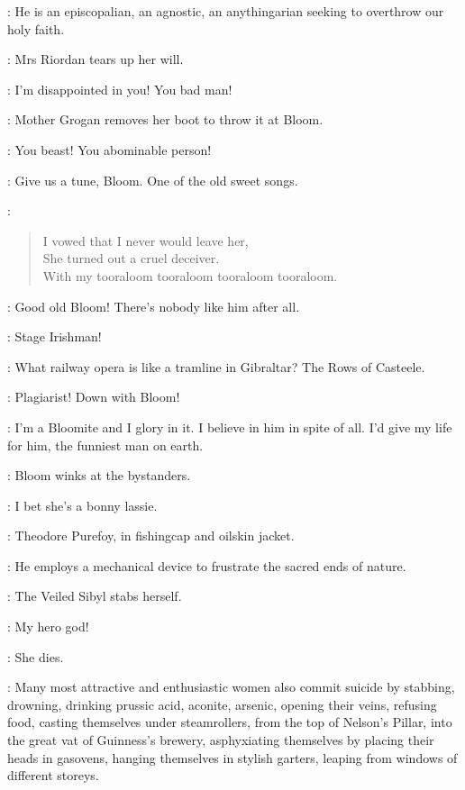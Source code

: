 \FatherFarley[1]:
He is an episcopalian,
an agnostic,
an anythingarian
seeking to overthrow our holy faith.

:
Mrs Riordan tears up her will.

\MrsRiordan:
I'm disappointed in you!
You bad man!

:
Mother Grogan removes her boot to throw it at Bloom.

\MotherGrogan:
You beast!
You abominable person!

\NoseyFlynn[2]:
Give us a tune,
Bloom.
One of the old sweet songs.

\Bloom:
\begin{verse}
    I vowed that I never would leave her,\\
    She turned out a cruel deceiver.\\
    With my tooraloom tooraloom tooraloom tooraloom.
\end{verse}

\HoppyHolohan[1]:
Good old Bloom!
There's nobody like him after all.

\PaddyLeonard[2]:
Stage Irishman!

\Bloom:
What railway opera is like a tramline in Gibraltar?
The Rows of Casteele.


\Lenehan[1]:
Plagiarist!
Down with Bloom!

\VeiledSibyl[2]:
I'm a Bloomite and I glory in it.
I believe in him in spite of all.
I'd give my life for him,
the funniest man on earth.

:
Bloom winks at the bystanders.

\Bloom:
I bet she's a bonny lassie.

:
Theodore Purefoy,
in fishingcap and oilskin jacket.

\TheodorePurefoy:
He employs a mechanical device to frustrate the sacred ends of nature.

:
The Veiled Sibyl stabs herself.

\VeiledSibyl:
My hero god!

:
She dies.

:
Many most attractive and enthusiastic women also commit suicide
by stabbing,
drowning,
drinking prussic acid,
aconite,
arsenic,
opening their veins,
refusing food,
casting themselves under steamrollers,
from the top of Nelson's Pillar,
into the great vat of Guinness's brewery,
asphyxiating themselves by placing their heads in gasovens,
hanging themselves in stylish garters,
leaping from windows of different storeys.


